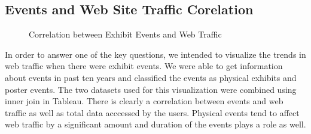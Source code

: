 \subsection{Events and Web Site Traffic Corelation} \label{vizevents}

\begin{figure}
\centering
{}
\caption{Correlation between Exhibit Events and Web Traffic}
\label{fig:EventTraffic}
\end{figure}

In order to answer one of the key questions, we intended to visualize the trends in web traffic when there were exhibit events. We were able to get information about events in past ten years and classified the events as physical exhibits and poster events. The two datasets used for this visualization were combined using inner join in Tableau. There is clearly a correlation between events and web traffic as well as total data acccessed by the users. Physical events tend to affect web traffic by a significant amount and duration of the events plays a role as well.
